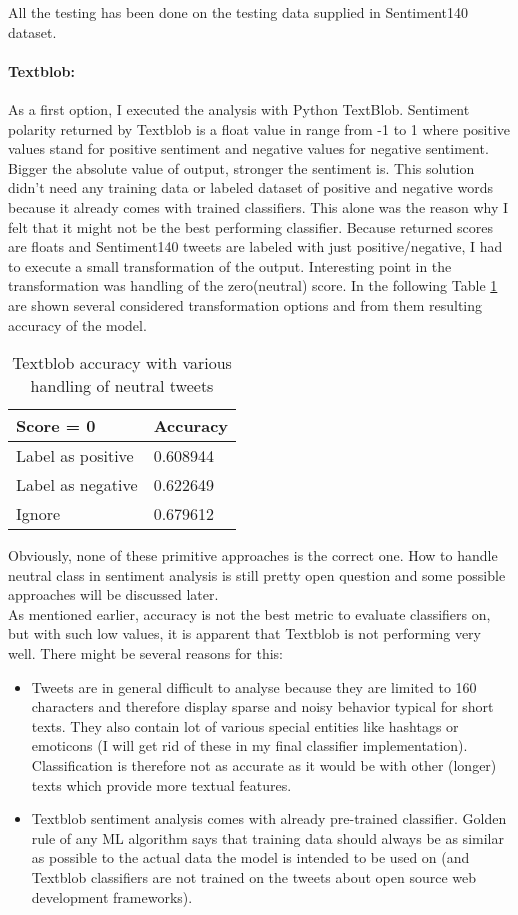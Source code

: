 All the testing has been done on the testing data supplied in Sentiment140 dataset.

\paragraph{Textblob:}
As a first option, I executed the analysis with Python TextBlob. Sentiment polarity returned by Textblob is a float value in range from -1 to 1 where positive values stand for positive sentiment and negative values for negative sentiment. Bigger the absolute value of output, stronger the sentiment is. This solution didn't need any training data or labeled dataset of positive and negative words because it already comes with trained classifiers. This alone was the reason why I felt that it might not be the best performing classifier. Because returned scores are floats and Sentiment140 tweets are labeled with just positive/negative, I had to execute a small transformation of the output. Interesting point in the transformation was handling of the zero(neutral) score. In the following Table \ref{table:TextblobNeutralTweetResolvingResults} are shown several considered transformation options and from them resulting accuracy of the model.
\begin{table}[H]
\centering
\begin{tabular}{ |p{3cm}||p{3cm}|}
 \hline
\textbf{ Score = 0 }& \textbf{Accuracy}\\
 \hline
 Label as positive   & 0.608944\\ \hline
 Label as negative & 0.622649\\ \hline
 Ignore & 0.679612\\ \hline 
\end{tabular}
\caption{Textblob accuracy with various handling of neutral tweets}
\label{table:TextblobNeutralTweetResolvingResults}
\end{table}
Obviously, none of these primitive approaches is the correct one. How to handle neutral class in sentiment analysis is still pretty open question and some possible approaches will be discussed later.\\
As mentioned earlier, accuracy is not the best metric to evaluate classifiers on, but with such low values, it is apparent that Textblob is not performing very well. There might be several reasons for this:
\begin{itemize}
\item Tweets are in general difficult to analyse because they are limited to 160 characters and therefore display sparse and noisy behavior typical for short texts. They also contain lot of various special entities like hashtags or emoticons (I will get rid of these in my final classifier implementation). Classification is therefore not as accurate as it would be with other (longer) texts which provide more textual features.
\item Textblob sentiment analysis comes with already pre-trained classifier. Golden rule of any ML algorithm says that training data should always be as similar as possible to the actual data the model is intended to be used on (and Textblob classifiers are not trained on the tweets about open source web development frameworks).
\end{itemize}

